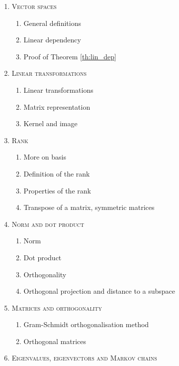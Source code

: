 \begin{enumerate}[label=\textbf{\arabic*.}]
\item \textsc{Vector spaces}
\vspace{-0.2cm}
\begin{enumerate}[label=\arabic*.,noitemsep]
\item General definitions
\item Linear dependency
\item Proof of Theorem \ref{th:lin_dep}
\end{enumerate}
\item \textsc{Linear transformations}
\vspace{-0.2cm}
\begin{enumerate}[label=\arabic*.,noitemsep]
\item Linear transformations
\item Matrix representation
\item Kernel and image
\end{enumerate}
\item \textsc{Rank}
\vspace{-0.2cm}
\begin{enumerate}[label=\arabic*.,noitemsep]
\item More on basis
\item Definition of the rank
\item Properties of the rank
\item Transpose of a matrix, symmetric matrices
\end{enumerate}
\item \textsc{Norm and dot product}
\vspace{-0.2cm}
\begin{enumerate}[label=\arabic*.,noitemsep]
\item Norm
\item Dot product
\item Orthogonality
\item Orthogonal projection and distance to a subspace
\end{enumerate}
\item \textsc{Matrices and orthogonality}
\vspace{-0.2cm}
\begin{enumerate}[label=\arabic*.,noitemsep]
\item Gram-Schmidt orthogonalisation method
\item Orthogonal matrices
\end{enumerate}
\item \textsc{Eigenvalues, eigenvectors and Markov chains}

\end{enumerate}
